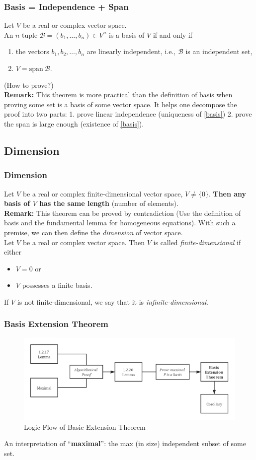 \documentclass[12pt, t]{beamer}
\renewcommand{\emph}[1]{{\color{Turquoise3}\textsl{#1}}}
\newcommand{\myseries}[2]{$#1_1,#1_2,\dots,#1_#2$}
\newcommand{\nullspace}{~\\[15pt]}
\begin{document}
\begin{frame}
    \frametitle{Basis = Independence + Span}
    Let $V$ be a real or complex vector space.\\ An $n$-tuple $\mathcal{B}=(b_1,\ldots,b_n)\in V^n$ is a basis of $V$ if and only if
    \begin{enumerate}
        \item the vectors \myseries{b}{n} are linearly independent, i.e., $\mathcal{B}$ is an independent set,
        \item $V=\text{span}~\mathcal{B}.$
    \end{enumerate}
    (How to prove?)
    \nullspace
    \textbf{Remark:} This theorem is more practical than the definition of basis when proving some set is a basis of some vector space. It helps one decompose the proof into two parts: 1. prove linear independence (uniqueness of \eqref{basis}) 2. prove the span is large enough (existence of \eqref{basis}).
\end{frame}

\subsection{Dimension}
\begin{frame}
    \frametitle{Dimension}
    Let $V$ be a real or complex finite-dimensional vector space, $V\neq\{0\}$. \textbf{Then any basis of $V$ has the same length }(number of elements).
    \nullspace
    \textbf{Remark:} This theorem can be proved by contradiction (Use the definition of basis and the fundamental lemma for homogeneous equations). With such a premise, we can then define the \emph{dimension} of vector space.
    \nullspace
    Let $V$ be a real or complex vector space. Then $V$ is called \emph{finite-dimensional} if either
    \begin{itemize}
        \item $V={0}$ or
        \item $V$ possesses a finite basis.
    \end{itemize}
    If $V$ is not finite-dimensional, we say that it is \emph{infinite-dimensional}.
\end{frame}

\begin{frame}
    \frametitle{Basis Extension Theorem}
    \begin{figure}[H]
        \centering
        \includegraphics[width=\textwidth]{chart1.png}
        \caption{Logic Flow of Basic Extension Theorem}
        \label{fig:bet}
    \end{figure}
    An interpretation of ``\textbf{maximal}'': the max (in size) independent subset of some set.
\end{frame}
\end{document}
